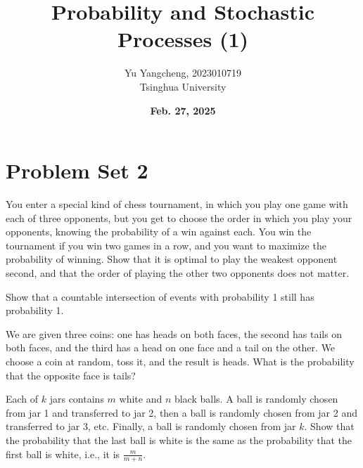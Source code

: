 \documentclass{article}
\title{Probability and Stochastic Processes (1) }
\author{Yu Yangcheng, 2023010719\\ Tsinghua University}
\date{\textbf{Feb. 27, 2025}}
\begin{document}
\maketitle

\section*{Problem Set 2}


\begin{question}
You enter a special kind of chess tournament, in which you play one game with each of three opponents, but you get to choose the order in which you play your opponents, knowing the probability of a win against each. You win the tournament if you win two games in a row, and you want to maximize the probability of winning. Show that it is optimal to play the weakest opponent second, and that the order of playing the other two opponents does not matter.
\end{question}

\begin{question}
Show that a countable intersection of events with probability 1 still has probability 1.
\end{question}

\begin{question}
We are given three coins: one has heads on both faces, the second has tails on both faces, and the third has a head on one face and a tail on the other. We choose a coin at random, toss it, and the result is heads. What is the probability that the opposite face is tails?
\end{question}

\begin{question}
Each of \(k\) jars contains \(m\) white and \(n\) black balls. A ball is randomly chosen from jar 1 and transferred to jar 2, then a ball is randomly chosen from jar 2 and transferred to jar 3, etc. Finally, a ball is randomly chosen from jar \(k\). Show that the probability that the last ball is white is the same as the probability that the first ball is white, i.e., it is \( \frac{m}{m + n} \).
\end{question}
\end{document}
